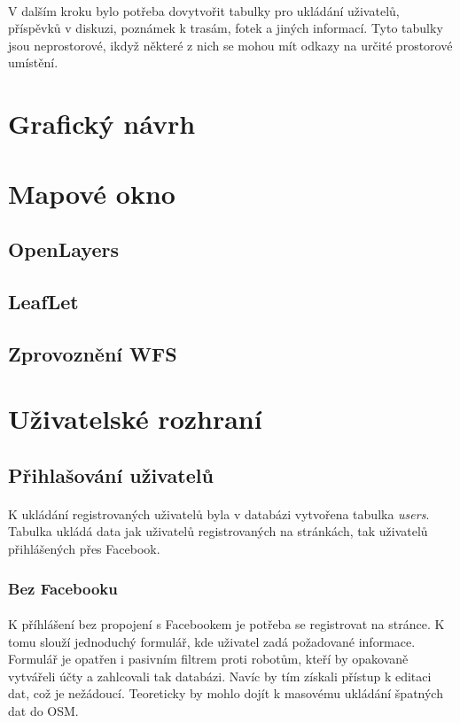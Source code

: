 \documentclass[11pt,a4paper,titlepage,oneside]{book}
\begin{document}
				\paragraph{} V dalším kroku bylo potřeba dovytvořit tabulky pro ukládání uživatelů, příspěvků v  diskuzi, poznámek k trasám, fotek a jiných informací. Tyto tabulky jsou neprostorové, ikdyž některé z nich se mohou mít odkazy na určité prostorové umístění.

		\section{Grafický návrh} %

		\section{Mapové okno}
			\subsection{OpenLayers}
			\subsection{LeafLet}
			\subsection{Zprovoznění WFS}

		\section{Uživatelské rozhraní}
			\subsection{Přihlašování uživatelů}
				\paragraph{}K ukládání registrovaných uživatelů byla v databázi vytvořena tabulka \textit{users}. Tabulka ukládá data jak uživatelů registrovaných na stránkách, tak uživatelů přihlášených přes Facebook.
				\subsubsection{Bez Facebooku}
					\paragraph{} K příhlášení bez propojení s Facebookem je potřeba se registrovat na stránce. K tomu slouží jednoduchý formulář, kde uživatel zadá požadované informace. Formulář je opatřen i pasivním filtrem proti robotům, kteří by opakovaně vytvářeli účty a zahlcovali tak databázi. Navíc by tím získali přístup k editaci dat, což je nežádoucí. Teoreticky by mohlo dojít k masovému ukládání špatných dat do OSM. 
\end{document}
